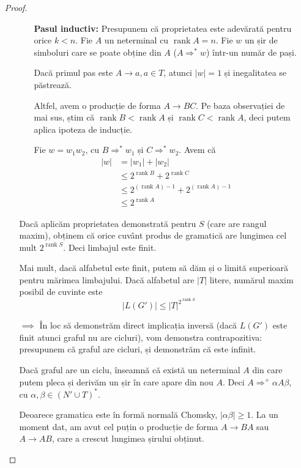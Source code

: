 \documentclass{article}
\newcommand{\abs}[1]{\left\lvert #1 \right\rvert}
\DeclareMathOperator{\rank}{rank}
\begin{document}
\begin{enumerate}
\begin{proof}
\begin{itemize}
\begin{itemize}
            \item[\textbf{Pasul inductiv:}] Presupunem că proprietatea este adevărată pentru orice \(k < n\). Fie \(A\) un neterminal cu \(\rank A = n\). Fie \(w\) un șir de simboluri care se poate obține din \(A\) (\(A \Rightarrow^* w\)) într-un număr de pași.
            
            Dacă primul pas este \(A \to a, a \in T\), atunci \(\abs{w} = 1\) și inegalitatea se păstrează.
            
            Altfel, avem o producție de forma \(A \to B C\). Pe baza observației de mai sus, știm că \(\rank B < \rank A\) și \(\rank C < \rank A\), deci putem aplica ipoteza de inducție.
            
            Fie \(w = w_1 w_2\), cu \(B \Rightarrow^* w_1\) și \(C \Rightarrow^* w_2\). Avem că
            \begin{align*}
                \abs{w} &= \abs{w_1} + \abs{w_2} \\
                &\leq 2^{\rank B} + 2^{\rank C} \\
                &\leq 2^{(\rank A) - 1} + 2^{(\rank A) - 1} \\
                &\leq 2^{\rank A}
            \end{align*}
        \end{itemize}
        
        Dacă aplicăm proprietatea demonstrată pentru \(S\) (care are rangul maxim), obținem că orice cuvânt produs de gramatică are lungimea cel mult \(2^{\rank S}\). Deci limbajul este finit.
        
        Mai mult, dacă alfabetul este finit, putem să dăm și o limită superioară pentru mărimea limbajului. Dacă alfabetul are \(\abs{T}\) litere, numărul maxim posibil de cuvinte este
        \[
            \abs{L(G')} \leq \abs{T}^{2^{\rank S}}
        \]
        
        \item[\(\implies\)] În loc să demonstrăm direct implicația inversă (dacă \(L(G')\) este finit atunci graful nu are cicluri), vom demonstra contrapozitiva: presupunem că graful are cicluri, și demonstrăm că este infinit.
        
        Dacă graful are un ciclu, înseamnă că există un neterminal \(A\) din care putem pleca și derivăm un șir în care apare din nou \(A\). Deci \(A \Rightarrow^+ \alpha A \beta\), cu \(\alpha, \beta \in (N' \cup T)^*\).
        
        Deoarece gramatica este în formă normală Chomsky, \(\abs{\alpha \beta} \geq 1\). La un moment dat, am avut cel puțin o producție de forma \(A \to BA\) sau \(A \to AB\), care a crescut lungimea șirului obținut.
        

\end{itemize}
\end{proof}
\end{enumerate}
\end{document}
